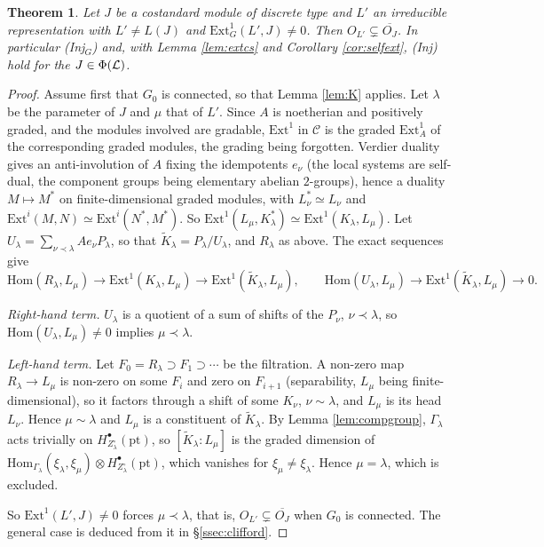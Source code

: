 \documentclass[a4paper,12pt,leqno]{amsart}
\theoremstyle{plain}
\newtheorem{thm}{Theorem}[section]
\theoremstyle{definition}
\begin{document}
\begin{thm}\label{thm:injprime} Let $J$ be a costandard module of discrete type and $L'$
an irreducible representation with $L'\neq L(J)$ and $\mathrm{Ext}^1_G(L',J)\neq0$. Then
$O_{L'}\subsetneq\overline{O_J}$. In particular (Inj$_G$) and, with Lemma \ref{lem:extcs} and Corollary
\ref{cor:selfext}, (Inj) hold for the $J\in\Phi(\mathcal{L})$.
\end{thm}

\begin{proof}
Assume first that $G_0$ is connected, so that Lemma \ref{lem:K} applies.
Let $\lambda$ be the parameter of $J$ and $\mu$ that of $L'$. Since $A$ is noetherian and positively
graded, and the modules involved are gradable, $\mathrm{Ext}^1$ in $\mathcal{C}$ is the graded
$\mathrm{Ext}^1_A$ of the corresponding graded modules, the grading being forgotten. Verdier duality gives an anti-involution of $A$ fixing the
idempotents $e_\nu$ (the local systems are self-dual, the component groups being elementary abelian
$2$-groups), hence a duality $M\mapsto M^*$ on finite-dimensional graded modules, with $L_\nu^*\simeq
L_\nu$ and $\mathrm{Ext}^i(M,N)\simeq\mathrm{Ext}^i(N^*,M^*)$. So
$\mathrm{Ext}^1(L_\mu,K_\lambda^*)\simeq\mathrm{Ext}^1(K_\lambda,L_\mu)$. Let $U_\lambda=\sum_{\nu\prec
\lambda}Ae_\nu P_\lambda$, so that $\widetilde K_\lambda=P_\lambda/U_\lambda$, and $R_\lambda$ as above.
The exact sequences give
\[\mathrm{Hom}(R_\lambda,L_\mu)\to\mathrm{Ext}^1(K_\lambda,L_\mu)\to\mathrm{Ext}^1(\widetilde
K_\lambda,L_\mu),\qquad \mathrm{Hom}(U_\lambda,L_\mu)\to\mathrm{Ext}^1(\widetilde K_\lambda,L_\mu)\to0.\]

\emph{Right-hand term.} $U_\lambda$ is a quotient of a sum of shifts of the $P_\nu$, $\nu\prec\lambda$,
so $\mathrm{Hom}(U_\lambda,L_\mu)\neq0$ implies $\mu\prec\lambda$.

\emph{Left-hand term.} Let $F_0=R_\lambda\supset F_1\supset\cdots$ be the filtration. A non-zero map
$R_\lambda\to L_\mu$ is non-zero on some $F_i$ and zero on $F_{i+1}$ (separability, $L_\mu$ being
finite-dimensional), so it factors through a shift of some $K_\nu$, $\nu\sim\lambda$, and $L_\mu$ is its
head $L_\nu$. Hence $\mu\sim\lambda$ and $L_\mu$ is a constituent of $\widetilde K_\lambda$. By Lemma
\ref{lem:compgroup}, $\Gamma_\lambda$ acts trivially on $H^\bullet_{Z_\lambda^\circ}(\mathrm{pt})$, so
$[\widetilde K_\lambda:L_\mu]$ is the graded dimension of $\mathrm{Hom}_{\Gamma_\lambda}(\xi_\lambda,
\xi_\mu)\otimes H^\bullet_{Z_\lambda^\circ}(\mathrm{pt})$, which vanishes for $\xi_\mu\neq\xi_\lambda$.
Hence $\mu=\lambda$, which is excluded.

So $\mathrm{Ext}^1(L',J)\neq0$ forces $\mu\prec\lambda$, that is, $O_{L'}\subsetneq\overline{O_J}$ when
$G_0$ is connected. The general case is deduced from it in \S\ref{ssec:clifford}.
\end{proof}
\end{document}
